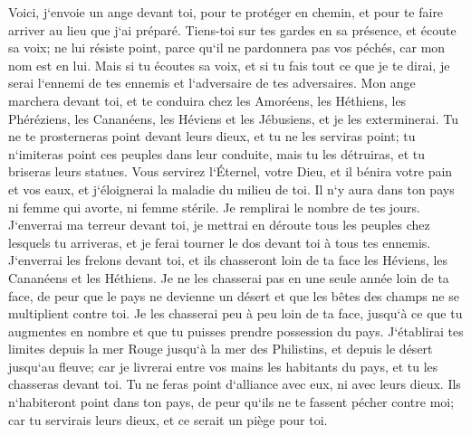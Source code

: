 \verse Voici, j`envoie un ange devant toi, pour te protéger en chemin, et pour te faire arriver au lieu que j`ai préparé. 
\verse Tiens-toi sur tes gardes en sa présence, et écoute sa voix; ne lui résiste point, parce qu`il ne pardonnera pas vos péchés, car mon nom est en lui. 
\verse Mais si tu écoutes sa voix, et si tu fais tout ce que je te dirai, je serai l`ennemi de tes ennemis et l`adversaire de tes adversaires. 
\verse Mon ange marchera devant toi, et te conduira chez les Amoréens, les Héthiens, les Phéréziens, les Cananéens, les Héviens et les Jébusiens, et je les exterminerai. 
\verse Tu ne te prosterneras point devant leurs dieux, et tu ne les serviras point; tu n`imiteras point ces peuples dans leur conduite, mais tu les détruiras, et tu briseras leurs statues. 
\verse Vous servirez l`Éternel, votre Dieu, et il bénira votre pain et vos eaux, et j`éloignerai la maladie du milieu de toi. 
\verse Il n`y aura dans ton pays ni femme qui avorte, ni femme stérile. Je remplirai le nombre de tes jours. 
\verse J`enverrai ma terreur devant toi, je mettrai en déroute tous les peuples chez lesquels tu arriveras, et je ferai tourner le dos devant toi à tous tes ennemis. 
\verse J`enverrai les frelons devant toi, et ils chasseront loin de ta face les Héviens, les Cananéens et les Héthiens. 
\verse Je ne les chasserai pas en une seule année loin de ta face, de peur que le pays ne devienne un désert et que les bêtes des champs ne se multiplient contre toi. 
\verse Je les chasserai peu à peu loin de ta face, jusqu`à ce que tu augmentes en nombre et que tu puisses prendre possession du pays. 
\verse J`établirai tes limites depuis la mer Rouge jusqu`à la mer des Philistins, et depuis le désert jusqu`au fleuve; car je livrerai entre vos mains les habitants du pays, et tu les chasseras devant toi. 
\verse Tu ne feras point d`alliance avec eux, ni avec leurs dieux. 
\verse Ils n`habiteront point dans ton pays, de peur qu`ils ne te fassent pécher contre moi; car tu servirais leurs dieux, et ce serait un piège pour toi. 

\chapter{}

